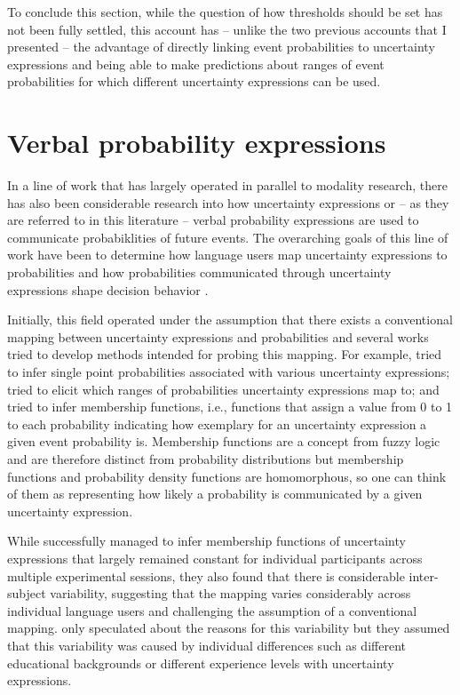 To conclude this section, while the question of how thresholds should be set has not been fully settled, this account has -- unlike the two previous accounts that I presented 
--  the advantage of directly linking event probabilities to uncertainty expressions and being able to make predictions about ranges of event probabilities for which different
uncertainty expressions can be used.

\section{Verbal probability expressions}

In a line of work that has largely operated in parallel to modality research, there has also been considerable research 
into how uncertainty expressions or -- as they are referred to in this literature -- verbal probability expressions are used
to communicate probabiklities of future events. The overarching goals of this line of work have been to determine how
language users map uncertainty expressions to probabilities and how probabilities communicated through uncertainty expressions
shape decision behavior \cite{BudescuWallsten1995}. 

Initially, this field operated under the assumption that there exists a conventional mapping between uncertainty expressions
and probabilities and several works tried to develop methods intended for probing this mapping. For example, \cite{BethMarom1982} 
tried to infer single point probabilities associated with various uncertainty expressions; \cite{Hamm1991} tried to elicit which ranges of
probabilities uncertainty expressions map to; and \cite{WallstenBudescuRapoportetal.1986} tried to infer membership functions, i.e., 
functions that assign a value from 0 to 1 to each probability indicating how exemplary for an uncertainty expression a given
event probability is. Membership functions are a concept from fuzzy logic and are therefore distinct from probability distributions but 
 membership functions and probability density functions are homomorphous, so one can think of them as representing how likely a 
probability is communicated by a given uncertainty expression.

While \cite{WallstenBudescuRapoportetal1986} successfully managed to infer membership functions of uncertainty expressions
that largely remained constant for individual participants across multiple experimental sessions, they also found that there is considerable
inter-subject variability, suggesting that the mapping varies considerably across individual language users and challenging
the assumption of a conventional mapping. \cite{WallstenBudescuRapoportetal1986} only speculated about the reasons 
for this variability but they assumed that this variability was caused by individual differences such as different educational backgrounds
or different experience levels with uncertainty expressions.

